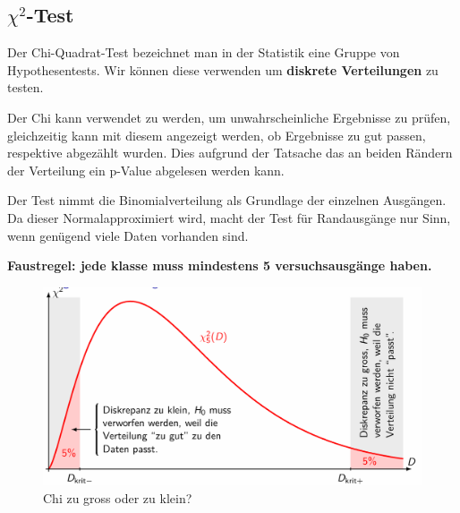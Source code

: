\documentclass[../Main.tex]{subfiles}
\begin{document}
\subsection{\(\chi^2\)-Test}
Der Chi-Quadrat-Test bezeichnet man in der Statistik eine Gruppe von Hypothesentests.
Wir können diese verwenden um \textbf{diskrete Verteilungen} zu testen.

Der Chi kann verwendet zu werden, um unwahrscheinliche Ergebnisse zu prüfen,
gleichzeitig kann mit diesem angezeigt werden, ob Ergebnisse zu gut passen,
respektive abgezählt wurden. Dies aufgrund der Tatsache das an beiden Rändern
der Verteilung ein p-Value abgelesen werden kann.

Der Test nimmt die Binomialverteilung als Grundlage der einzelnen Ausgängen.
Da dieser Normalapproximiert wird, macht der Test für Randausgänge nur Sinn,
wenn genügend viele Daten vorhanden sind.

\textbf{Faustregel: jede klasse muss mindestens 5 versuchsausgänge haben.}

\begin{figure}[H]
    \centering
    \includegraphics[width=0.75\linewidth]{Images/chi-gross-klein.png}
    \caption{Chi zu gross oder zu klein?}
\end{figure}

\end{document}
